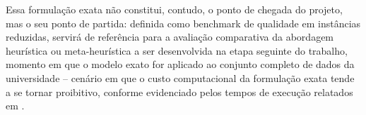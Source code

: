 \documentclass[11pt,a4paper]{article}
\begin{document}
Essa formulação exata não constitui, contudo, o ponto de chegada do projeto, mas o seu
ponto de partida: definida como benchmark de qualidade em instâncias reduzidas, servirá
de referência para a avaliação comparativa da abordagem heurística ou meta-heurística a
ser desenvolvida na etapa seguinte do trabalho, momento em que o modelo exato for
aplicado ao conjunto completo de dados da universidade -- cenário em que o custo
computacional da formulação exata tende a se tornar proibitivo, conforme evidenciado
pelos tempos de execução relatados em \cite{nogueira2018,permanhane2014}.



\end{document}
